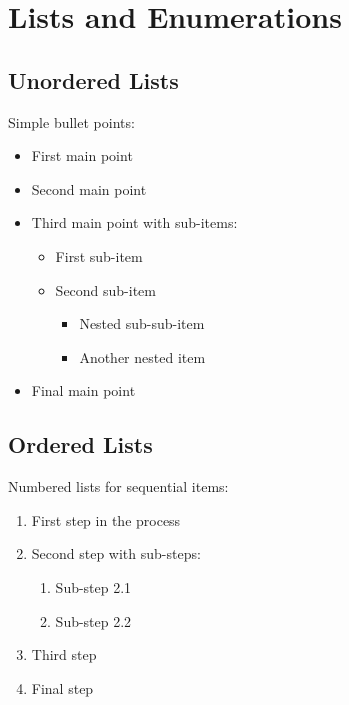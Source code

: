 \section{Lists and Enumerations}
\label{sec:lists}

\subsection*{Unordered Lists}
\label{subsec:unordered_lists}

Simple bullet points:

\begin{itemize}
	\item First main point
	\item Second main point
	\item Third main point with sub-items:
	      \begin{itemize}
		      \item First sub-item
		      \item Second sub-item
		            \begin{itemize}
			            \item Nested sub-sub-item
			            \item Another nested item
		            \end{itemize}
	      \end{itemize}
	\item Final main point
\end{itemize}

\subsection*{Ordered Lists}
\label{subsec:ordered_lists}

Numbered lists for sequential items:

\begin{enumerate}
	\item First step in the process
	\item Second step with sub-steps:
	      \begin{enumerate}
		      \item Sub-step 2.1
		      \item Sub-step 2.2
	      \end{enumerate}
	\item Third step
	\item Final step
\end{enumerate}

